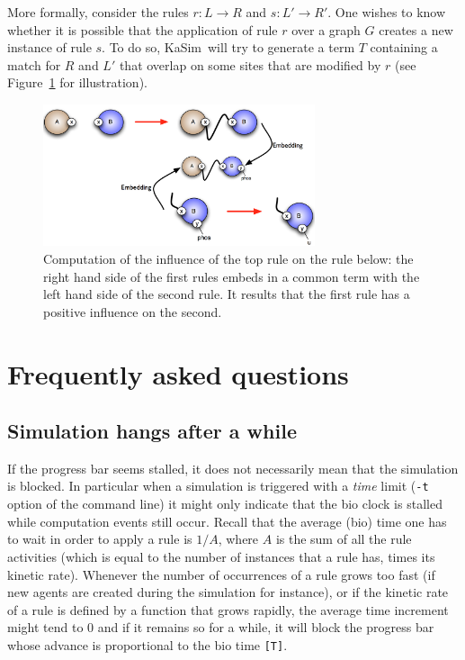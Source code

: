 \documentclass[11pt]{book}
\def\KaSim{\textsf{KaSim}}
\def\ttt#1{\texttt{#1}}
\def\rar{\rightarrow}
\begin{document}
More formally, consider the rules $r:L\rar R$ and $s:L'\rar R'$. One wishes to know whether it is possible that the application of rule $r$ over a graph $G$ creates a new instance of rule $s$. To do so, \KaSim~will try to generate a term $T$ containing a match for $R$ and $L'$ that overlap on some sites that are modified by $r$ (see Figure~\ref{fig:im} for illustration).

\begin{figure}[htbp] %
   \centering
   \includegraphics[width=8cm]{img/im.png} 
   \caption{Computation of the influence of the top rule on the rule below: the right hand side of the first rules embeds in a common term with the left hand side of the second rule. It results that the first rule has a positive influence on the second.}
   \label{fig:im}
\end{figure}

\chapter{Frequently asked questions}
\section*{Simulation hangs after a while}
If the progress bar seems stalled, it does not necessarily mean that the simulation is blocked. In particular when a simulation is triggered with a \emph{time} limit (\ttt{-t} option of the command line) it might only indicate that the bio clock is stalled while computation events still occur. Recall that the average (bio) time one has to wait in order to apply a rule is $1/A$, where $A$ is the sum of all the rule activities (which is equal to the number of instances that a rule has, times its kinetic rate). Whenever the number of occurrences of a rule grows too fast (if new agents are created during the simulation for instance), or if the kinetic rate of a rule is defined by a function that grows rapidly, the average time increment might tend to 0 and if it remains so for a while, it will block the progress bar whose advance is proportional to the bio time \ttt{[T]}. 
\end{document}
